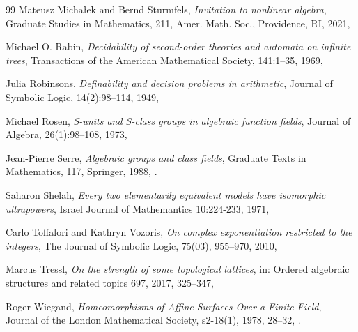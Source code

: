 \documentclass{amsart}
\theoremstyle{plain}
\theoremstyle{definition}
\begin{document}
\begin{thebibliography}{99}
	 Mateusz Micha\l ek and Bernd Sturmfels, {\it Invitation to nonlinear algebra}, Graduate Studies in Mathematics, 211, Amer. Math. Soc., Providence, RI, 2021, 
	
	Michael O. Rabin, \emph{Decidability of second-order theories and automata on infinite trees},  Transactions of the American Mathematical Society, 141:1--35, 1969,  

    Julia Robinsons, \emph{Definability and decision problems in arithmetic}, Journal of Symbolic Logic, 14(2):98--114, 1949, 
	
	Michael Rosen, \emph{S-units and S-class groups in algebraic function fields}, Journal of Algebra, 26(1):98--108, 1973, 
	
	Jean-Pierre Serre, \emph{Algebraic groups and class fields}, Graduate Texts in Mathematics, 117, Springer, 1988, .

    Saharon Shelah, \emph{Every two elementarily equivalent models have isomorphic ultrapowers}, Israel Journal of Mathemantics 10:224-233, 1971, 

	Carlo Toffalori and Kathryn Vozoris, 
	\emph{On complex exponentiation restricted to the integers},  
	The Journal of Symbolic Logic, 75(03), 955--970, 2010, 
	
	
	Marcus Tressl, 
	\emph{On the strength of some topological lattices}, in: Ordered algebraic structures and related topics 697, 2017, 325--347, 
	
	Roger Wiegand, \emph{Homeomorphisms of Affine Surfaces Over a Finite Field},
	Journal of the London Mathematical Society, s2-18(1), 1978, 28--32, .
\end{thebibliography}
\end{document}
